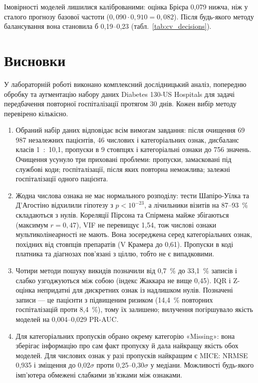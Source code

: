 \documentclass[14pt,a4paper]{extreport}
\begin{document}
Імовірності моделей лишилися каліброваними: оцінка Брієра 0,079 нижча, ніж у сталого прогнозу базової частоти ($0{,}090 \cdot 0{,}910 = 0{,}082$). Після будь-якого методу балансування вона становила б 0,19--0,23 (табл.~\ref{tab:cv_decisions}).

\section{Висновки}

У лабораторній роботі виконано комплексний дослідницький аналіз, попередню обробку та аугментацію набору даних Diabetes 130-US Hospitals для задачі передбачення повторної госпіталізації протягом 30 днів. Кожен вибір методу перевірено кількісно.

\begin{enumerate}
\item Обраний набір даних відповідає всім вимогам завдання: після очищення 69\,987 незалежних пацієнтів, 46 числових і категоріальних ознак, дисбаланс класів 1~:~10,1, пропуски в 9 стовпцях і категоріальні ознаки до 756 значень. Очищення усунуло три приховані проблеми: пропуски, замасковані під службові коди; госпіталізації, після яких повторна неможлива; залежні госпіталізації одного пацієнта.

\item Жодна числова ознака не має нормального розподілу: тести Шапіро-Уїлка та Д'Агостіно відхилили гіпотезу з $p < 10^{-23}$, а лічильники візитів на 87--93~\% складаються з нулів. Кореляції Пірсона та Спірмена майже збігаються (максимум $r = 0{,}47$), VIF не перевищує 1,54, тож числові ознаки мультиколінеарності не мають. Вона зосереджена серед категоріальних ознак, похідних від стовпців препаратів (V Крамера до 0,61). Пропуски в коді платника та діагнозах пов'язані з ціллю, тобто не є випадковими.

\item Чотири методи пошуку викидів позначили від 0,7~\% до 33,1~\% записів і слабко узгоджуються між собою (індекс Жаккара не вище 0,45). IQR і Z-оцінка непридатні для дискретних ознак із надлишком нулів. Позначені записи --- це пацієнти з підвищеним ризиком (14,4~\% повторних госпіталізацій проти 8,4~\%), тому їх залишено; вилучення погіршувало якість моделей на 0,004--0,029 PR-AUC.

\item Для категоріальних пропусків обрано окрему категорію «Missing»: вона зберігає інформацію про сам факт пропуску й дала найкращу якість обох моделей. Для числових ознак у разі пропусків найкращим є MICE: NRMSE 0,935 і зміщення до 0,02$\sigma$ проти 0,25--0,30$\sigma$ у медіани. Можливості будь-якого імп'ютера обмежені слабкими зв'язками між ознаками.


\end{enumerate}
\end{document}
